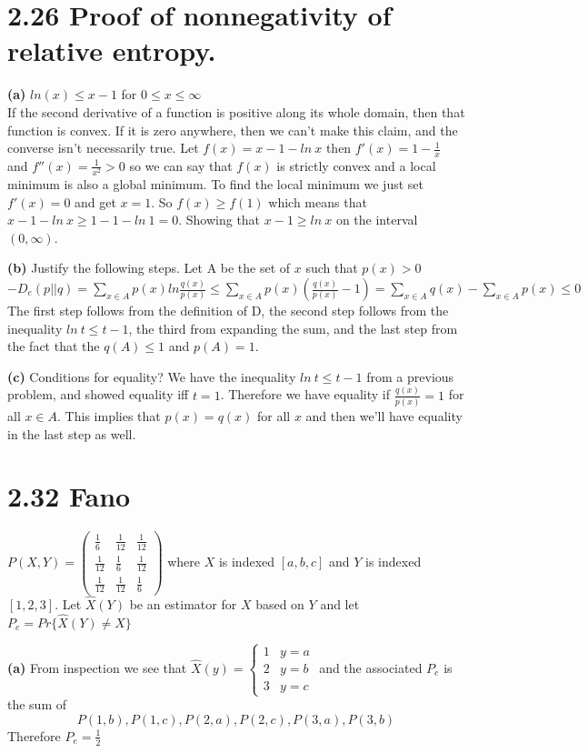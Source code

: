 \documentclass[10pt]{article}
\begin{document}
\begin{tiny}
\begin{multicols}{3}
\section*{2.26 Proof of nonnegativity of relative entropy.}
\textbf{(a)} $ln(x) \leq x-1$ for $0\leq x \leq \infty$\\
If the second derivative of a function is positive along its whole domain, 
then that function is convex. 
If it is zero anywhere, then we can't make this claim, 
and the converse isn't necessarily true.
Let \(f(x)=x-1-ln\ x \) then 
\(
f'(x)= 1-\frac{1}{x}\) and \(
f''(x)=\frac{1}{x^2} > 0
\)
so we can say that $f(x)$ is strictly convex and a local minimum is also a global minimum. 
To find the local minimum we just set $f'(x)=0$ and get $x=1$. 
So $f(x) \geq f(1)$ which means that $x-1-ln\ x \geq 1-1-ln\ 1 = 0$. 
Showing that $x-1 \geq ln\ x$ on the interval $(0,\infty)$.
				 
\textbf{(b)} Justify the following steps. 
Let A be the set of $x$ such that $p(x) > 0$
\(
-D_e(p||q)=\sum_{x\in A} p(x) ln \frac{q(x)}{p(x)}
\leq \sum_{x\in A} p(x)\left( \frac{q(x)}{p(x)}-1\right)
=\sum_{x\in A} q(x) - \sum_{x\in A} p(x)
\leq 0
\)
The first step follows from the definition of D, the second step follows from the inequality $ln\ t \leq t - 1$, the third from expanding the sum, and the last step from the fact that the $q(A) \leq 1$ and $p(A)=1$.
				
\textbf{(c)} Conditions for equality?
We have the inequality $ln\ t \leq t-1$ from a previous problem, and showed equality iff $t=1$. Therefore we have equality if $\frac{q(x)}{p(x)}=1$ for all $x\in A$. This implies that $p(x)=q(x)$ for all $x$ and then we'll have equality in the last step as well. 	
          
\section*{2.32 Fano}
\(P(X,Y) = \left( \begin{array}{ccc}
\frac{1}{6} & \frac{1}{12} & \frac{1}{12} \\
\frac{1}{12} & \frac{1}{6} & \frac{1}{12} \\
\frac{1}{12} & \frac{1}{12} & \frac{1}{6} \end{array} \right)\)
 where $X$ is indexed $[a,b,c]$ and $Y$ is indexed $[1,2,3]$. Let $\hat{X}(Y)$  be an estimator for $X$ based on $Y$ and let $P_e=Pr\{\hat{X}(Y)\neq X\}$

\textbf{(a)}
From inspection we see that 
\(\hat{X}(y)=\left\{ \begin{array}{cc}
1 & y=a\\
2 & y=b\\
3 & y=c \end{array}\right. \)
and the associated $P_e$ is the sum of 
\[
P(1,b),  P(1,c), P(2,a),
P(2,c), P(3,a), P(3,b) \] Therefore $P_e=\frac{1}{2}$


\end{multicols}
\end{tiny}
\end{document}
